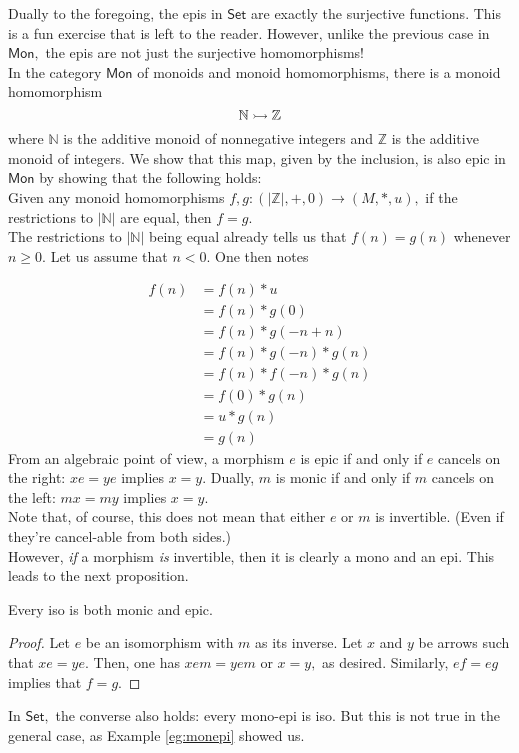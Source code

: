 Dually to the foregoing, the epis in $\mathsf{Set}$ are exactly the surjective functions. This is a fun exercise that is left to the reader. However, unlike the previous case in $\mathsf{Mon},$ the epis are not just the surjective homomorphisms!\\
\example{\label{eg:monepi}} In the category $\mathsf{Mon}$ of monoids and monoid homomorphisms, there is a monoid homomorphism
\begin{equation*} 
	\mathbb{N} \rightarrowtail \mathbb{Z}
\end{equation*}
where $\mathbb{N}$ is the additive monoid of nonnegative integers and $\mathbb{Z}$ is the additive monoid of integers. We show that this map, given by the inclusion, is also epic in $\mathsf{Mon}$ by showing that the following holds:\\
Given any monoid homomorphisms $f, g: (|\mathbb{Z}|, +, 0) \to (M, *, u),$ if the restrictions to $|\mathbb{N}|$ are equal, then $f = g.$\\
The restrictions to $|\mathbb{N}|$ being equal already tells us that $f(n) = g(n)$ whenever $n \ge 0.$ Let us assume that $n < 0.$ One then notes

\begin{align*} 
	f(n) &= f(n)*u\\
	&= f(n)*g(0)\\
	&= f(n)*g(-n + n)\\
	&= f(n)*g(-n)*g(n)\\
	&= f(n)*f(-n)*g(n)\\
	&= f(0)*g(n)\\
	&= u*g(n)\\
	&= g(n)
\end{align*}
From an algebraic point of view, a morphism $e$ is epic if and only if $e$ cancels on the right: $xe = ye$ implies $x = y.$ Dually, $m$ is monic if and only if $m$ cancels on the left: $mx = my$ implies $x = y.$\\
Note that, of course, this does not mean that either $e$ or $m$ is invertible. (Even if they're cancel-able from both sides.)\\
However, \emph{if} a morphism \emph{is} invertible, then it is clearly a mono and an epi. This leads to the next proposition.
\begin{prop}
	Every iso is both monic and epic.
\end{prop}
\begin{proof} 
	Let $e$ be an isomorphism with $m$ as its inverse. Let $x$ and $y$ be arrows such that $xe = ye.$ Then, one has $xem = yem$ or $x = y,$ as desired. Similarly, $ef = eg$ implies that $f = g.$ 
\end{proof}
In $\mathsf{Set},$ the converse also holds: every mono-epi is iso. But this is not true in the general case, as Example \ref{eg:monepi} showed us.

